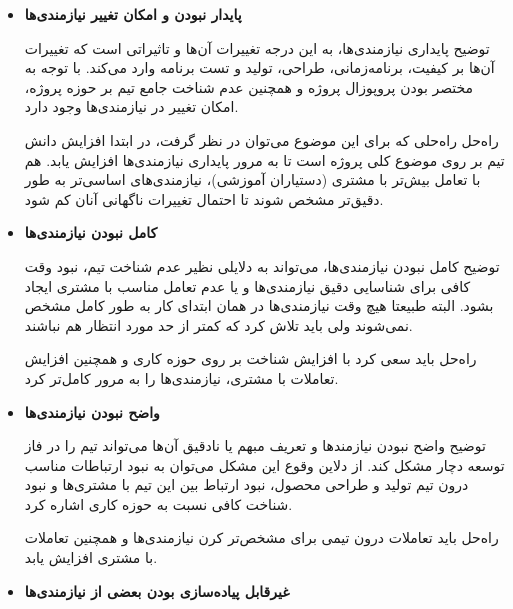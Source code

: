 \begin{itemize}
	
	\item
	\textbf{پایدار نبودن و امکان تغییر نیازمندی‌ها}
	
	
	توضیح \hspace*{1cm}  پایداری نیازمندی‌ها، به این درجه تغییرات آن‌ها و تاثیراتی است که تغییرات آن‌ها بر کیفیت، برنامه‌زمانی، طراحی، تولید و تست برنامه وارد می‌کند. با توجه به مختصر بودن پروپوزال پروژه و همچنین عدم شناخت جامع تیم بر حوزه پروژه،‌ امکان تغییر در نیازمندی‌ها وجود دارد.
	
	
	راه‌حل \hspace*{1cm}  راه‌حلی که برای این موضوع می‌توان در نظر گرفت، در ابتدا افزایش دانش تیم بر روی موضوع کلی پروژه است تا به مرور پایداری نیاز‌مندی‌ها افزایش یابد. هم با تعامل بیش‌تر با مشتری (دستیاران آموزشی)، نیازمندی‌های اساسی‌تر به طور دقیق‌تر مشخص شوند تا احتمال تغییرات ناگهانی آنان کم شود.
	
	\item 
\textbf{	کامل نبودن نیازمندی‌ها}
	
	توضیح \hspace*{1cm}  
	کامل نبودن نیازمندی‌ها،  می‌تواند به دلایلی نظیر عدم شناخت تیم، نبود وقت‌ کافی برای شناسایی دقیق نیازمندی‌ها و یا عدم تعامل مناسب با مشتری ایجاد بشود. البته طبیعتا هیچ‌ وقت نیازمندی‌ها در همان ابتدای کار به طور کامل مشخص نمی‌شوند ولی باید تلاش کرد که کمتر از حد مورد انتظار هم نباشند.
	
	راه‌حل \hspace*{1cm}  باید سعی کرد با افزایش شناخت بر روی حوزه کاری و همچنین افزایش تعاملات با مشتری، نیازمندی‌ها را به مرور کامل‌تر کرد.
	
	
	
	\item 
	\textbf{	واضح نبودن نیازمندی‌ها}
	
	
	توضیح \hspace*{1cm}  
واضح نبودن نیازمند‌ها و تعریف مبهم یا نادقیق ‌آن‌ها می‌تواند تیم را در فاز توسعه دچار مشکل کند. از دلاین وقوع این مشکل می‌توان به نبود ارتباطات مناسب درون تیم تولید و طراحی محصول، نبود ارتباط بین این تیم با مشتری‌ها و نبود شناخت کافی نسبت به حوزه کاری اشاره کرد.
	
	راه‌حل \hspace*{1cm}  باید تعاملات درون تیمی برای مشخص‌تر کرن نیازمندی‌ها و همچنین تعاملات با مشتری افزایش یابد.
	
	
	\item 
	\textbf{غیرقابل پیاده‌سازی بودن بعضی از نیازمندی‌ها}
	

\end{itemize}
